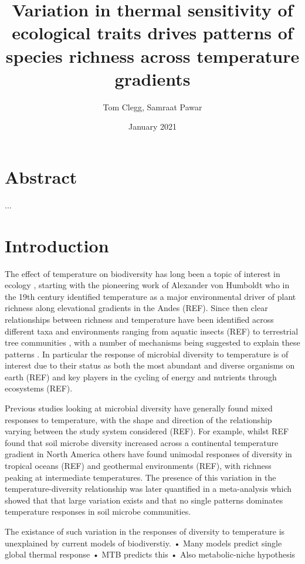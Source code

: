 \documentclass{article}
\title{Variation in thermal sensitivity of ecological traits drives patterns of species richness across temperature gradients}
\author{Tom Clegg, Samraat Pawar}
\date{January 2021}
\begin{document}
\maketitle

\section*{Abstract}

...

\section*{Introduction}

The effect of temperature on biodiversity has long been a topic of interest in ecology \citep{Gaston2000}, starting with the pioneering work of Alexander von Humboldt who in the 19th century identified temperature as a major environmental driver of plant richness along elevational gradients in the Andes (REF). Since then clear relationships between richness and temperature have been identified across different taxa and environments ranging from aquatic insects (REF) to terrestrial tree communities \citep{Wang2009}, with a number of mechanisms being suggested to explain these patterns \citep{Rohde1992,Gaston2000}. In particular the response of microbial diversity to temperature is of interest due to their status as both the most abundant and diverse organisms on earth (REF) and key players in the cycling of energy and nutrients through ecosystems (REF). 

Previous studies looking at microbial diversity have generally found mixed responses to temperature, with the shape and direction of the relationship varying between the study system considered (REF). For example, whilst REF found that soil microbe diversity increased across a continental temperature gradient in North America others have found unimodal responses of diversity in tropical oceans (REF) and geothermal environments (REF), with richness peaking at intermediate temperatures. The presence of this variation in the temperature-diversity relationship was later quantified in a meta-analysis which showed that that large variation exists and that no single patterns dominates temperature responses in soil microbe communities. 

The existance of such variation in the responses of diversity to temperature is unexplained by current models of biodiverstiy. 
• Many models predict single global thermal response 
• MTB predicts this
• Also metabolic-niche hypothesis
\end{document}
